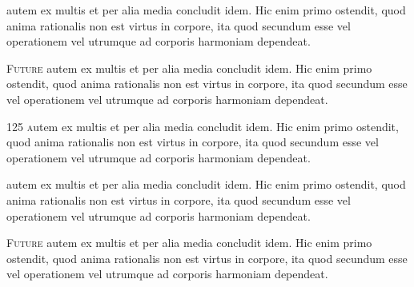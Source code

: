 
\blStartBook



\lettrine{}{}
autem ex multis et per alia media concludit idem. Hic enim primo ostendit, quod anima rationalis 
non est virtus in corpore, ita quod secundum esse vel
operationem vel utrumque ad corporis harmoniam dependeat.

\lettrine{}{Future}
autem ex multis et per alia media concludit idem. Hic enim primo ostendit, quod anima rationalis 
non est virtus in corpore, ita quod secundum esse vel
operationem vel utrumque ad corporis harmoniam dependeat.

\lettrine{125 }
autem ex multis et per alia media concludit idem. Hic enim primo ostendit, quod anima rationalis 
non est virtus in corpore, ita quod secundum esse vel
operationem vel utrumque ad corporis harmoniam dependeat.


\lettrine{}{}
autem ex multis et per alia media concludit idem. Hic enim primo ostendit, quod anima rationalis 
non est virtus in corpore, ita quod secundum esse vel
operationem vel utrumque ad corporis harmoniam dependeat.

\lettrine{}{Future}
autem ex multis et per alia media concludit idem. Hic enim primo ostendit, quod anima rationalis 
non est virtus in corpore, ita quod secundum esse vel
operationem vel utrumque ad corporis harmoniam dependeat.

